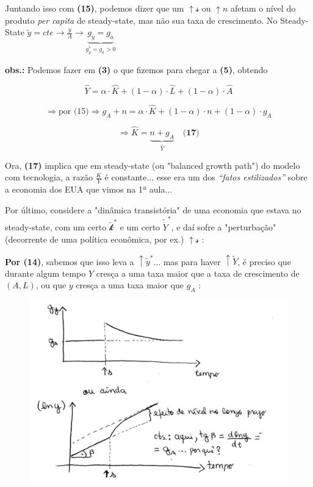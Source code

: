 \documentclass[a4paper,12pt]{article}[abntex2]
\begin{document}
Juntando isso com \textbf{(15)}, podemos dizer que um \(\uparrow \mathcal{s}\) ou \(\uparrow n\) afetam o nível do produto \textit{per capita} de steady-state, mas não sua taxa de crescimento. No Steady-State \(\tilde{y}=cte \rightarrow \frac{y}{A}\rightarrow \underbrace{g_y=g_a}_{g_y^*=g_a>0}\)

\textbf{obs.:} Podemos fazer em \textbf{(3)} o que fizemos para chegar a \textbf{(5)}, obtendo

\[
\hat{Y} = \alpha \cdot \hat{K} + (1-\alpha) \cdot \hat{L} + (1-\alpha) \cdot \hat{A}
\]

\[
\Rightarrow \text{por (15)} \Rightarrow g_A + n = \alpha \cdot \hat{K} + (1-\alpha) \cdot n + (1-\alpha) \cdot g_A
\]

\[
\Rightarrow \boxed{\hat{K} = \underbrace{n + g_A}_{\hat{Y}}} \quad \textbf{(17)}
\]

Ora, \textbf{(17)} implica que em steady-state (ou "balanced growth path") do modelo com tecnologia, a razão \textbf{\(\frac{K}{Y}\)} é constante... esse era um dos \textit{“fatos estilizados”} sobre a economia dos EUA que vimos na 1ª aula...

Por último, considere a "dinâmica transistória" de uma economia que estava no steady-state, com um certo \(\tilde{\mathcal{k}}^*\) e um certo \(\tilde{\dot{Y}}^*\), e daí sofre a "perturbação" (decorrente de uma política econômica, por ex.) $\uparrow \mathcal{s}$ :

\textbf{Por (14)}, sabemos que isso leva a \(\uparrow \tilde{y}^*\)... mas para haver \(\uparrow \tilde{Y}\), é preciso que durante algum tempo $Y$ cresça a uma taxa maior que a taxa de crescimento de $(A,L)$, ou que $y$ cresça a uma taxa maior que $g_A$ :

\begin{figure}[H]
    \centering
    \includegraphics[width=0.7\linewidth]{Imagens/a12i1.png}
\end{figure}
\end{document}
